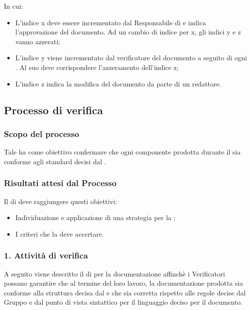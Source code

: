 In cui:
\begin{itemize}
\item L'indice x deve essere incrementato dal Responsabile di  e indica l'approvazione del documento. Ad un cambio di indice per x, gli indici y e z vanno azzerati;
\item L'indice y viene incrementato dal verificatore del documento a seguito di ogni . Al suo  deve corrispondere l'azzeramento dell'indice z;
\item L'indice z indica la modifica del documento da parte di un redattore.
\end{itemize}






\subsection{Processo di verifica}
\subsubsection{Scopo del processo}
Tale  ha come obiettivo confermare che ogni componente prodotta durante il  sia conforme agli standard decisi dal .
\subsubsection{Risultati attesi dal Processo}
Il  di  deve raggiungere questi obiettivi:
\begin{itemize}
\item Individuazione e applicazione di una strategia per la ;
\item I criteri che la  deve accertare.
\end{itemize}

\subsubsection{1. Attivit\`a di verifica}
A seguito viene descritto il  di  per la documentazione affinchè i Verificatori possano garantire che al termine del loro lavoro, la documentazione prodotta sia conforme alla struttura decisa dal  e che sia corretta rispetto alle regole decise dal Gruppo e dal punto di vista sintattico per il linguaggio deciso per il documento.

